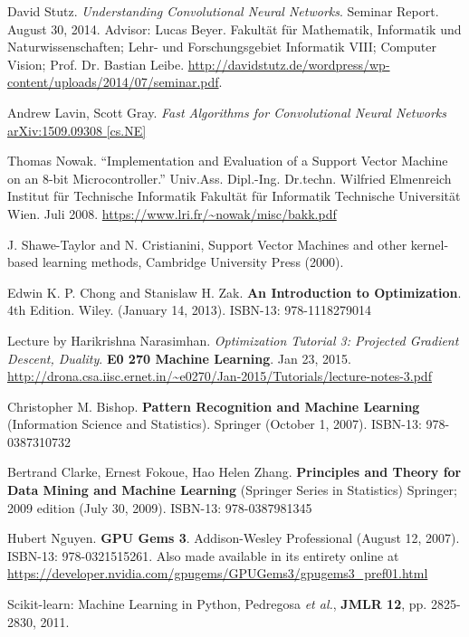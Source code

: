 \documentclass[10pt]{amsart}
\begin{document}
\begin{thebibliography}{9}
David Stutz.  \emph{Understanding Convolutional Neural Networks}.  Seminar Report.  August 30, 2014.  Advisor: Lucas Beyer.  Fakultät für Mathematik, Informatik und Naturwissenschaften; Lehr- und Forschungsgebiet Informatik VIII; Computer Vision; Prof. Dr. Bastian Leibe.  \url{http://davidstutz.de/wordpress/wp-content/uploads/2014/07/seminar.pdf}.  

Andrew Lavin, Scott Gray.  \emph{Fast Algorithms for Convolutional Neural Networks} \href{https://arxiv.org/abs/1509.09308}{arXiv:1509.09308 [cs.NE]}

Thomas Nowak.  ``Implementation and Evaluation of a Support Vector Machine on an 8-bit Microcontroller.''  Univ.Ass. Dipl.-Ing. Dr.techn. Wilfried Elmenreich Institut f\"{u}r Technische Informatik Fakult\"{a}t f\"{u}r Informatik Technische Universit\"{a}t Wien.  Juli 2008.  \url{https://www.lri.fr/~nowak/misc/bakk.pdf}

J.  Shawe-Taylor  and  N.  Cristianini,  Support  Vector  Machines  and  other  kernel-based  learning  methods,
Cambridge University Press (2000).

Edwin K. P. Chong and Stanislaw H. Zak.  \textbf{An Introduction to Optimization}.  4th Edition.  Wiley.  (January 14, 2013).  ISBN-13: 978-1118279014
  
Lecture by Harikrishna Narasimhan.  \emph{Optimization Tutorial 3: Projected Gradient Descent, Duality}.  \textbf{E0 270 Machine Learning}.  Jan 23, 2015.  \url{http://drona.csa.iisc.ernet.in/~e0270/Jan-2015/Tutorials/lecture-notes-3.pdf}

Christopher M. Bishop.  \textbf{Pattern Recognition and Machine Learning} (Information Science and Statistics).  Springer (October 1, 2007).  ISBN-13: 978-0387310732


Bertrand Clarke, Ernest Fokoue, Hao Helen Zhang.   \textbf{Principles and Theory for Data Mining and Machine Learning} (Springer Series in Statistics)  Springer; 2009 edition (July 30, 2009).  ISBN-13: 978-0387981345
 

Hubert Nguyen. \textbf{GPU Gems 3}.  Addison-Wesley Professional (August 12, 2007).  ISBN-13: 978-0321515261.  Also made available in its entirety online at \url{https://developer.nvidia.com/gpugems/GPUGems3/gpugems3_pref01.html}

  Scikit-learn: Machine Learning in Python, Pedregosa \emph{et al.}, \textbf{JMLR 12}, pp. 2825-2830, 2011.



\end{thebibliography}
\end{document}
